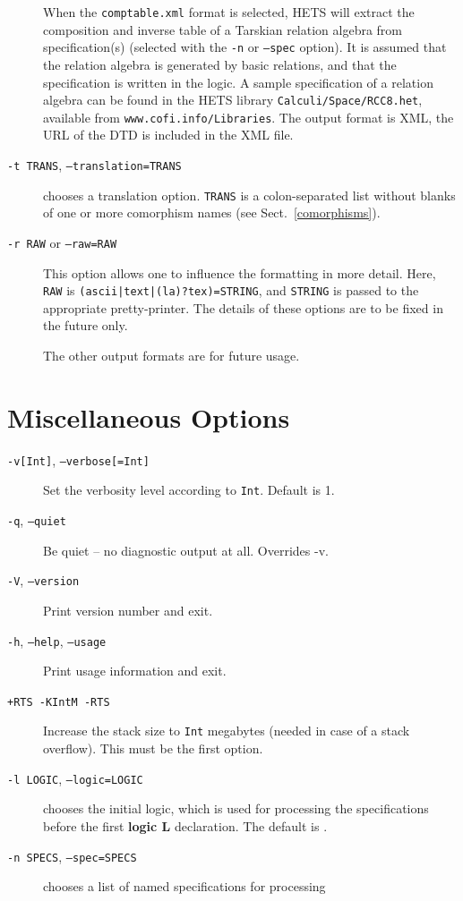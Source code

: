 \documentclass{article}
\newcommand{\normalTEXTSC}[2]{{#1\scriptsize#2}}
\newcommand     {\Hets}{\normalTEXTSC{H}{ETS}\xspace}
\begin{document}
\begin{description}
When the \texttt{comptable.xml} format is selected, \Hets will extract
the composition and inverse table of a Tarskian relation algebra from
specification(s) (selected with the \texttt{-n} or \texttt{--spec}
option). It is assumed that the relation algebra is
generated by basic relations, and that the specification is written
in the \CASL logic. A sample specification of a relation
algebra can be found in the \Hets library \texttt{Calculi/Space/RCC8.het},
available from \texttt{www.cofi.info/Libraries}.
The output format is XML, the URL of the DTD is included in the
XML file.

\item[\texttt{-t TRANS}, \texttt{--translation=TRANS}]
chooses a translation option. \texttt{TRANS} is a colon-separated list 
without blanks of one or more comorphism names (see Sect.~\ref{comorphisms}).

\item[\texttt{-r RAW} or \texttt{--raw=RAW}] This option  allows one
to influence the formatting in more detail.
Here, \texttt{RAW} is \texttt{(ascii|text|(la)?tex)=STRING},
and \texttt{STRING} is passed to the appropriate pretty-printer.
The details of these options are to be fixed in the future only.

The other output formats are for future usage.
\end{description}

\section{Miscellaneous Options}

\begin{description}
\item[\texttt{-v[Int]}, \texttt{--verbose[=Int]}] 
Set the verbosity level according to \texttt{Int}. Default is 1.
\item[\texttt{-q}, \texttt{--quiet}] 
Be quiet -- no diagnostic output at all. Overrides -v.
\item[\texttt{-V}, \texttt{--version}] Print version number and exit.
\item[\texttt{-h}, \texttt{--help}, \texttt{--usage}]  
Print usage information and exit.
\item[\texttt{+RTS -KIntM -RTS}] Increase the stack size to 
 \texttt{Int} megabytes (needed in case of a stack overflow). 
This must be the first option.
\item[\texttt{-l LOGIC}, \texttt{--logic=LOGIC}] chooses the initial logic, which is used for processing the specifications before the first \textbf{logic L}
declaration. The default is \CASL.
\item[\texttt{-n SPECS}, \texttt{--spec=SPECS}] 
chooses a list of named specifications for processing
\end{description}
\end{document}
